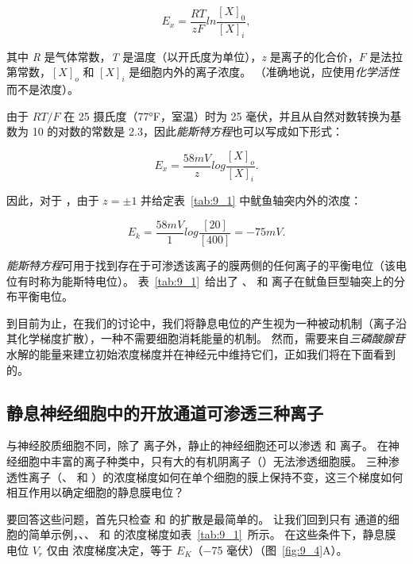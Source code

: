 \begin{equation}\label{eq:9_Nernst_Equation}
	E_x = \frac{RT}{zF} ln \frac{[X]_0}{[X]_i},
\end{equation}

其中 \textit{R} 是气体常数，\textit{T} 是温度（以开氏度为单位），\textit{z} 是离子的化合价，$ F $ 是法拉第常数，$ [X]_o $ 和 $ [X]_i $ 是细胞内外的离子浓度。
（准确地说，应使用\textit{化学活性}而不是浓度）。


由于 $RT/F$ 在 25 摄氏度（77°F，室温）时为 25 毫伏，并且从自然对数转换为基数为 10 的对数的常数是 2.3，因此\textit{能斯特方程}也可以写成如下形式：

\begin{equation}\label{eq:9_Nernst_Equation_58}
	E_x = \frac{58 mV}{z} 
			log \frac{[X]_o}{[X]_i}.
\end{equation}


因此，对于 ，由于 $ z = \pm 1 $ 并给定表~\ref{tab:9_1} 中鱿鱼轴突内外的浓度：

\begin{equation}\label{eq:9_axon_concentrations}
	E_k = \frac{58 mV}{1} 
			log \frac{[20]}{[400]}
			= -75 mV.
\end{equation}


\textit{能斯特方程}可用于找到存在于可渗透该离子的膜两侧的任何离子的平衡电位（该电位有时称为能斯特电位）。
表~\ref{tab:9_1}~给出了 、 和  离子在鱿鱼巨型轴突上的分布平衡电位。


到目前为止，在我们的讨论中，我们将静息电位的产生视为一种被动机制（离子沿其化学梯度扩散），一种不需要细胞消耗能量的机制。
然而，需要来自\textit{三磷酸腺苷}水解的能量来建立初始浓度梯度并在神经元中维持它们，正如我们将在下面看到的。



\subsection{静息神经细胞中的开放通道可渗透三种离子}

与神经胶质细胞不同，除了  离子外，静止的神经细胞还可以渗透  和  离子。
在神经细胞中丰富的离子种类中，只有大的有机阴离子（）无法渗透细胞膜。
三种渗透性离子（、 和 ）的浓度梯度如何在单个细胞的膜上保持不变，这三个梯度如何相互作用以确定细胞的静息膜电位？


要回答这些问题，首先只检查  和  的扩散是最简单的。
让我们回到只有  通道的细胞的简单示例，、、 和  的浓度梯度如表~\ref{tab:9_1}~所示。
在这些条件下，静息膜电位 $V_r$ 仅由  浓度梯度决定，等于 $E_K$（−75 毫伏）（图~\ref{fig:9_4}A）。


